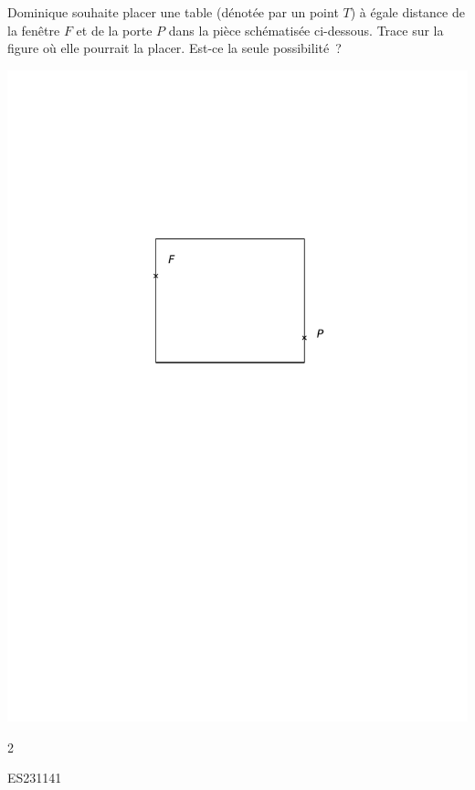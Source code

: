 \documentclass[a4paper,11pt]{report}
\begin{document}
\begin{exop}
{Dominique souhaite placer une table (dénotée par un point $T$) à égale distance de la fenêtre $F$ et de la porte $P$ dans la pièce schématisée ci-dessous. Trace sur la figure où elle pourrait la placer. Est-ce la seule possibilité~?

\begin{center}
	\includegraphics[scale=1]{media/es-10/12-9}
\end{center}
}
{2}
\end{exop}
\begin{exof}{ES23}{114}{1}
\end{exof}
\end{document}
